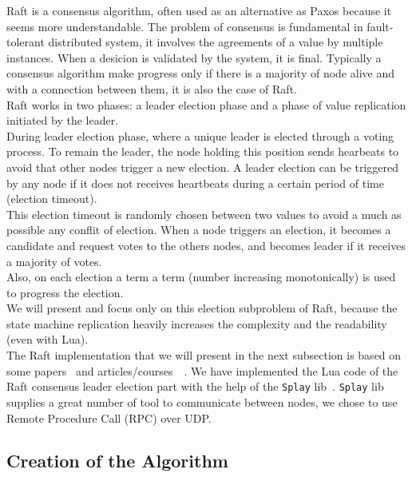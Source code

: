 \documentclass{eplmastersthesis}
\begin{document}
        Raft is a consensus algorithm, often used as an alternative as Paxos because
        it seems more understandable. The problem of consensus is fundamental
        in fault-tolerant distributed system, it involves the agreements of
        a value by multiple instances. When a desicion is validated by the system,
        it is final. Typically a consensus algorithm make progress only if there is
        a majority of node alive and with a connection between them, it is
        also the case of Raft. \\

        Raft works in two phases: a leader election phase and a phase of
        value replication initiated by the leader.\\
        During leader election phase, where a unique leader is elected
        through a voting process. To remain the leader, the node holding
        this position sends hearbeats to avoid that other nodes trigger a
        new election. A leader election can be triggered by any node if it
        does not receives heartbeats during a certain period of time (election
        timeout).\\
        This election timeout is randomly chosen between two values
        to avoid a much as possible any conflit of election. When a node
        triggers an election, it becomes a candidate and request votes to
        the others nodes, and becomes leader if it receives a majority of votes.\\
        Also, on each election a term a term (number increasing monotonically)
        is used to progress the election.\\
        We will present and focus only on this election subproblem of
        Raft, because the state machine replication heavily increases the complexity and
        the readability (even with Lua).\\

        The Raft implementation that we will present in the next subsection is based on
        some papers~\cite{RaftPaper} and articles/courses~\cite{RaftSlide}~\cite{RaftSite}.
        We have implemented the Lua code of the Raft consensus leader
        election part with the help of the \texttt{Splay} lib~\cite{SplayLib}.
        \texttt{Splay} lib supplies a great number of tool to communicate
        between nodes, we chose to use Remote Procedure Call (RPC) over UDP.\\

      \subsection{Creation of the Algorithm}
\end{document}
